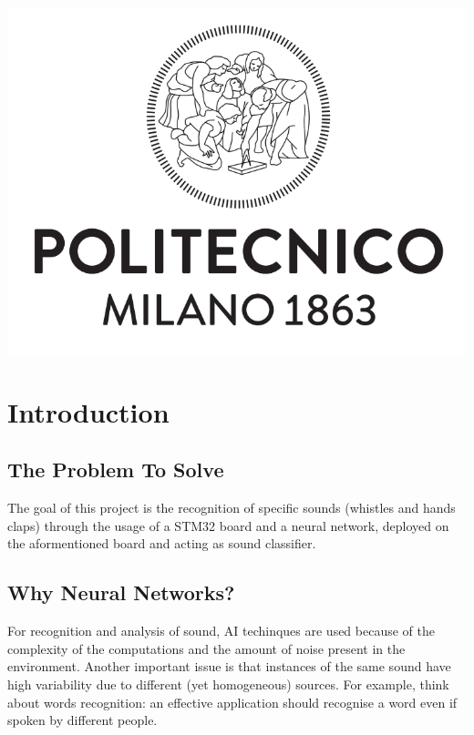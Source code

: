 \documentclass[12pt]{article}
\begin{document}
\begin{titlepage}
\begin{center}
	\includegraphics[scale=0.24]{img/Logo_Politecnico_Milano.png}                                               
\end{center}

\vfill

\end{titlepage}



\section{Introduction}

\subsection{The Problem To Solve}
The goal of this project is the recognition of specific sounds (whistles and hands claps) through the usage of a STM32 board and a neural network, deployed on the aformentioned board and acting as sound classifier.

\subsection{Why Neural Networks?}
For recognition and analysis of sound, AI techinques are used because of the complexity of the computations and the amount of noise present in the environment. Another important issue is that instances of the same sound have high variability due to different (yet homogeneous) sources. For example, think about words recognition: an effective application should recognise a word even if spoken by different people.
\end{document}
